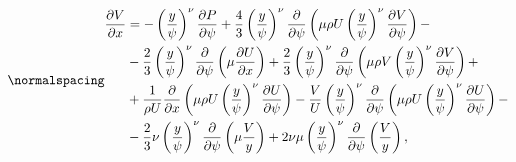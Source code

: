 \begin{equation}
\label{eq1:navie_parabol3}
\normalspacing
\begin{split}
\frac{\partial V}{\partial x}&=-\left(\frac{y}{\psi}\right)^\nu \frac{\partial P}{\partial \psi}+\frac{4}{3}\left(\frac{y}{\psi}\right)^\nu \frac{\partial}{\partial \psi}\left(\mu \rho U\left(\frac{y}{\psi}\right)^\nu \frac{\partial V}{\partial \psi}\right)-\\
&-\frac{2}{3}\left(\frac{y}{\psi}\right)^\nu \frac{\partial}{\partial \psi}\left(\mu \frac{\partial U}{\partial x}\right) +\frac{2}{3}\left(\frac{y}{\psi}\right)^\nu \frac{\partial}{\partial \psi}\left(\mu \rho V\left(\frac{y}{\psi}\right)^\nu \frac{\partial V}{\partial \psi}\right)+\\
&+\frac{1}{\rho U} \frac{\partial}{\partial x}\left(\mu \rho U\left(\frac{y}{\psi}\right)^\nu \frac{\partial U}{\partial \psi}\right) -\frac{V}{U}\left(\frac{y}{\psi}\right)^\nu \frac{\partial}{\partial \psi}\left(\mu \rho U\left(\frac{y}{\psi}\right)^\nu \frac{\partial U}{\partial \psi}\right)-\\
&-\frac{2}{3} \nu\left(\frac{y}{\psi}\right)^\nu \frac{\partial}{\partial \psi}\left(\mu \frac{V}{y}\right)+2 \nu \mu\left(\frac{y}{\psi}\right)^\nu \frac{\partial}{\partial \psi}\left(\frac{V}{y}\right),
\end{split}
\end{equation}

